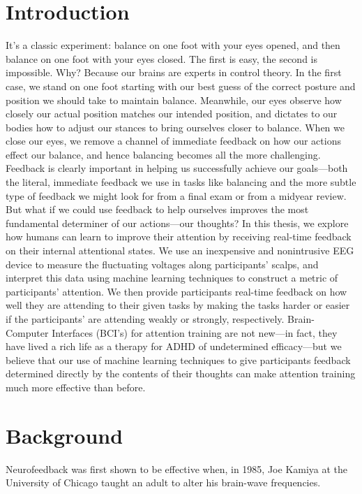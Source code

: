 \documentclass[11pt]{report}
\begin{document}
\section{Introduction}
It’s a classic experiment: balance on one foot with your eyes opened, and then balance on one foot with your eyes closed.  The first is easy, the second is impossible.  Why?  Because our brains are experts in control theory.  In the first case, we stand on one foot starting with our best guess of the correct posture and position we should take to maintain balance.  Meanwhile, our eyes observe how closely our actual position matches our intended position, and dictates to our bodies how to adjust our stances to bring ourselves closer to balance.  When we close our eyes, we remove a channel of immediate feedback on how our actions effect our balance, and hence balancing becomes all the more challenging.
Feedback is clearly important in helping us successfully achieve our goals—both the literal, immediate feedback we use in tasks like balancing and the more subtle type of feedback we might look for from a final exam or from a midyear review.  But what if we could use feedback to help ourselves improves the most fundamental determiner of our actions—our thoughts?  In this thesis, we explore how humans can learn to improve their attention by receiving real-time feedback on their internal attentional states.  We use an inexpensive and nonintrusive EEG device to measure the fluctuating voltages along participants’ scalps, and interpret this data using machine learning techniques to construct a metric of participants’ attention.  We then provide participants real-time feedback on how well they are attending to their given tasks by making the tasks harder or easier if the participants’ are attending weakly or strongly, respectively.  Brain-Computer Interfaces (BCI’s) for attention training are not new—in fact, they have lived a rich life as a therapy for ADHD of undetermined efficacy—but we believe that our use of machine learning techniques to give participants feedback determined directly by the contents of their thoughts can make attention training much more effective than before. 

\section{Background}

Neurofeedback was first shown to be effective when, in 1985, Joe Kamiya at the University of Chicago taught an adult to alter his brain-wave frequencies\cite{Lofthouse}.  
\end{document}
